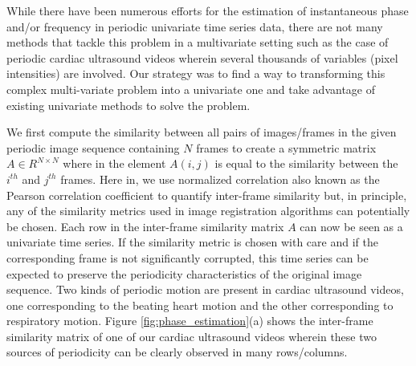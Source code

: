 \documentclass[runningheads,a4paper]{llncs}
\begin{document}
%
While there have been numerous efforts for the estimation of instantaneous phase and/or frequency in periodic univariate time series data\cite{Boashash1992,Lu2013,Luo2003}, there are not many methods that tackle this problem in a multivariate setting such as the case of periodic cardiac ultrasound videos wherein several thousands of variables (pixel intensities) are involved. Our strategy was to find a way to transforming this complex multi-variate problem into a univariate one and take advantage of existing univariate methods to solve the problem. 

	We first compute the similarity between all pairs of images/frames in the given periodic image sequence containing $N$ frames to create a symmetric matrix $A \in R^{N \times N}$ where in the element $A(i,j)$ is equal to the similarity between the $i^{th}$ and $j^{th}$ frames. Here in, we use normalized correlation also known as the Pearson correlation coefficient to quantify inter-frame similarity but, in principle, any of the similarity metrics used in image registration algorithms can potentially be chosen. Each row in the inter-frame similarity matrix $A$ can now be seen as a univariate time series. If the similarity metric is chosen with care and if the corresponding frame is not significantly corrupted, this time series can be expected to preserve the periodicity characteristics of the original image sequence. Two kinds of periodic motion are present in cardiac ultrasound videos, one corresponding to the beating heart motion and the other corresponding to respiratory motion. Figure \ref{fig:phase_estimation}(a) shows the inter-frame similarity matrix of one of our cardiac ultrasound videos wherein these two sources of periodicity can be clearly observed in many rows/columns. 
\end{document}
